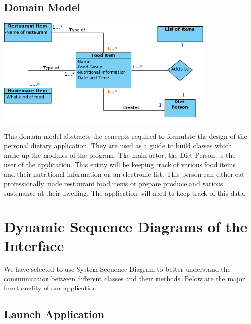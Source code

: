 \documentclass{scrreprt}
\begin{document}
\section{Domain Model}

\includegraphics[width=11cm]{pictures/Domain-Diagram.png}

This domain model abstracts the concepts required to formulate the design of the personal dietary application. They are used as a guide to build classes which make up the modules of the program. The main actor, the Diet Person, is the user of the application. This entity will be keeping track of various food items and their nutritional information on an electronic list. This person can either eat professionally made restaurant food items or prepare produce and various sustenance at their dwelling. The application will need to keep track of this data.

\chapter{Dynamic Sequence Diagrams of the Interface}

We have selected to use System Sequence Diagram to better understand the communication between different classes and their methods. Below are the major functionality of our application:

\section{Launch Application}
\end{document}
